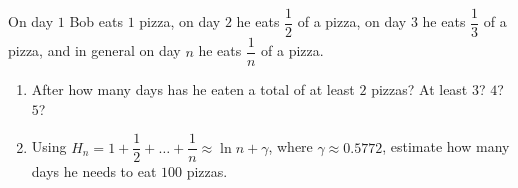 On day $1$ Bob eats $1$ pizza, on day $2$ he eats $\dfrac12$ of a pizza, on day $3$ he eats $\dfrac13$ of a pizza, and in general on day $n$ he eats $\dfrac1n$ of a pizza.
\begin{enumerate}
\item[(a)] After how many days has he eaten a total of at least $2$ pizzas? At least $3$? $4$? $5$?
\item[(b)] Using $H_n=1+\dfrac12+\dots+\dfrac1n\approx\ln n+\gamma$, where $\gamma\approx0.5772$, estimate how many days he needs to eat $100$ pizzas.
\end{enumerate}

